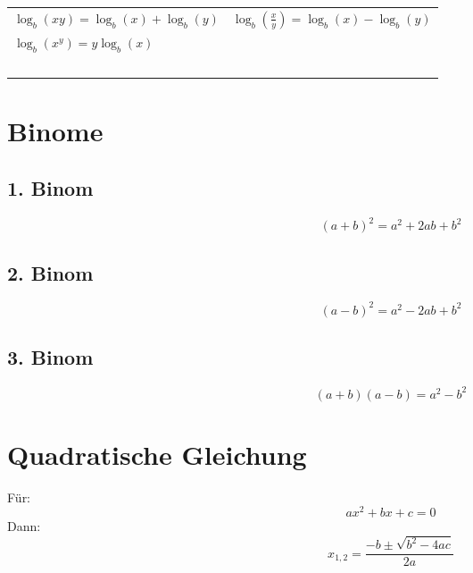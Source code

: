 \documentclass{report}
\begin{document}
\begin{tabularx}{1\textwidth} { 
    >{\centering\arraybackslash}X 
    >{\centering\arraybackslash}X  }
    \begin{math}
        \log_{b}(xy) = \log_{b}(x) + \log_{b}(y)
    \end{math}
    &
    \begin{math}
        \log_{b}(\frac{x}{y}) = \log_{b}(x) - \log_{b}(y)
    \end{math}
    \\ [7pt]
    \begin{math}
        \log_{b}(x^y) = y \log_{b}(x)
    \end{math}
    &
    \begin{math}
        {}
    \end{math}
    \\ [7pt]
    \begin{math}
        {}
    \end{math}
    &
    \begin{math}
        {}
    \end{math}
    \\ [7pt]
\end{tabularx}

\section{Binome}
\subsection{1. Binom}
\[(a+b)^2 = a^2 + 2ab + b^2\]

\subsection{2. Binom}
\[(a-b)^2 = a^2 - 2ab + b^2\]

\subsection{3. Binom}
\[(a+b)(a-b) = a^2 -b^2\]

\section{Quadratische Gleichung}
Für:
\[ax^2+bx+c=0\]
Dann:
\[x_{1,2}=\frac{-b\pm\sqrt{b^2-4ac}}{2a}\]
\end{document}
